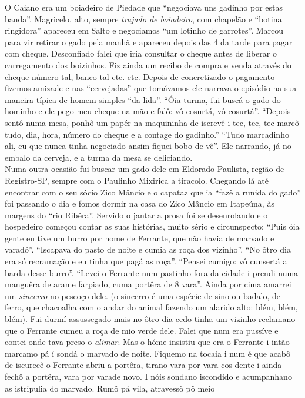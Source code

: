 \documentclass[12pt,brazil,]{book}
\begin{document}
O Caiano era um boiadeiro de Piedade que ``negociava uns gadinho por
estas banda''. Magricelo, alto, sempre \emph{trajado de boiadeiro}, com
chapelão e ``botina ringidora'' apareceu em Salto e negociamos ``um
lotinho de garrotes''. Marcou para vir retirar o gado pela manhã e
apareceu depois das 4 da tarde para pagar com cheque. Desconfiado falei
que iria consultar o cheque antes de liberar o carregamento dos
boizinhos. Fiz ainda um recibo de compra e venda através do cheque
número tal, banco tal etc. etc. Depois de concretizado o pagamento
fizemos amizade e nas ``cervejadas'' que tomávamos ele narrava o
episódio na sua maneira típica de homem simples ``da lida''. ``Óia
turma, fui buscá o gado do hominho e ele pego meu cheque na mão e falô:
vô cosurtá, vô cosurtá''. ``Depois sentô numa mesa, ponhô um papér na
maquininha de iscrevê i tec, tec, tec marcô tudo, dia, hora, número do
cheque e a contage do gadinho.'' ``Tudo marcadinho ali, eu que nunca
tinha negociado ansim fiquei bobo de vê''. Ele narrando, já no embalo da
cerveja, e a turma da mesa se deliciando.\\
Numa outra ocasião fui buscar um gado dele em Eldorado Paulista, região
de Registro-SP, sempre com o Paulinho Mixirica a tiracolo. Chegando lá
até encontrar com o seu sócio Zico Mâncio e o capataz que ia ``fazê a
runida do gado'' foi passando o dia e fomos dormir na casa do Zico
Mâncio em Itapeúna, às margens do ``rio Ribêra''. Servido o jantar a
prosa foi se desenrolando e o hospedeiro começou contar as suas
histórias, muito sério e circunspecto: ``Puis óia gente eu tive um burro
por nome de Ferrante, que não havia de marvado e varadô''. ``Iscapava do
pasto de noite e cumia as roça dos vizinho''. ``No ôtro dia era só
recramação e eu tinha que pagá as roça''. ``Pensei cumigo: vô cunsertá a
barda desse burro''. ``Levei o Ferrante num pastinho fora da cidade i
prendi numa manguêra de arame farpiado, cuma portêra de 8 vara''. Ainda
por cima amarrei um \emph{sincerro} no pescoço dele. (o sincerro é uma
espécie de sino ou badalo, de ferro, que chacoalha com o andar do animal
fazendo um alarido alto: blém, blém, blém). Fui durmí assussegado mais
no ôtro dia cedo tinha um vizinho reclamano que o Ferrante cumeu a roça
de mio verde dele. Falei que num era pussíve e contei onde tava preso o
\emph{alimar}. Mas o hóme insistiu que era o Ferrante i intão marcamo pá
í sondá o marvado de noite. Fiquemo na tocaia i num é que acabô de
iscurecê o Ferrante abriu a portêra, tirano vara por vara cos dente i
ainda fechô a portêra, vara por varade novo. I nóis sondano iscondido e
acumpanhano as istripulia do marvado. Rumô pá vila, atravessô pô meio
\end{document}
